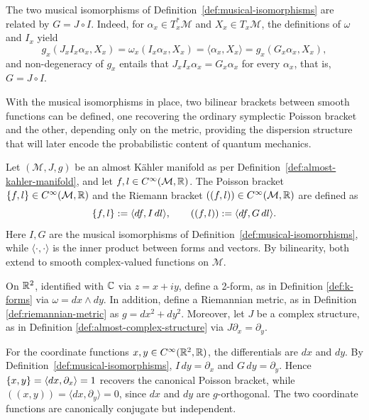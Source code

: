 \begin{remark}
	\label{rem:G-JI}
	The two musical isomorphisms of Definition~\ref{def:musical-isomorphisms}
	are related by $G=J\circ I$. Indeed, for $\alpha_x\in T_x^*\mathcal{M}$ and
	$X_x\in T_x\mathcal{M}$, the definitions of $\omega$ and $I_x$ yield
	\begin{equation}
		g_x(J_xI_x\alpha_x,X_x)=\omega_x(I_x\alpha_x,X_x)=\langle\alpha_x,X_x\rangle=g_x(G_x\alpha_x,X_x),
	\end{equation}
	and non-degeneracy of $g_x$ entails that $J_xI_x\alpha_x=G_x\alpha_x$
	for every $\alpha_x$, that is, $G=J\circ I$.
\end{remark}

With the musical isomorphisms in place, two bilinear brackets between
smooth functions can be defined, one recovering the ordinary
symplectic Poisson bracket and the other, depending only on the
metric, providing the dispersion structure that will later encode the
probabilistic content of quantum mechanics.

\begin{definition}
	\label{def:poisson-riemann-bracket}
	Let $(\mathcal{M},J,g)$ be an almost Kähler manifold as per
	Definition~\ref{def:almost-kahler-manifold}, and let $f,l\in
	C^\infty(\mathcal{M},\R)$. The Poisson bracket $\poisson{f}{l} \in C^\infty(\mathcal{M},\R)$ and the Riemann
	bracket $((f,l)) \in C^\infty(\mathcal{M},\R)$ are defined as
	\begin{equation}
		\{f,l\}:=\langle df,I\,dl\rangle,\qquad ((f,l)):=\langle df,G\,dl\rangle.
	\end{equation}
	Here $I,G$ are the musical isomorphisms of Definition~\ref{def:musical-isomorphisms}, while $\langle \cdot, \cdot \rangle$ is the inner product between forms and vectors. By bilinearity, both extend to smooth complex-valued functions on $\mathcal{M}$.
\end{definition}

\begin{example}
	On $\mathbb{R}^2$, identified with $\mathbb{C}$ via $z=x+iy$, define a 2-form, as in Definition \ref{def:k-forms} via $\omega=dx\wedge dy$. In addition, define a Riemannian metric, as in Definition \ref{def:riemannian-metric} as $g=dx^2+dy^2$. Moreover, let $J$ be a complex structure, as in Definition \ref{def:almost-complex-structure} via $J\partial_x=\partial_y$. 
	
	For the coordinate functions $x, y \in C^\infty(\mathbb{R}^2, \mathbb{R})$, the differentials are $dx$ and $dy$. By Definition~\ref{def:musical-isomorphisms}, $I\,dy=\partial_x$ and $G\,dy=\partial_y$. Hence $\{x,y\}=\langle dx,\partial_x\rangle=1$ recovers the canonical Poisson bracket, while $((x,y))=\langle dx,\partial_y\rangle=0$, since $dx$ and $dy$ are $g$-orthogonal. The two coordinate functions are canonically conjugate but independent.
\end{example}

